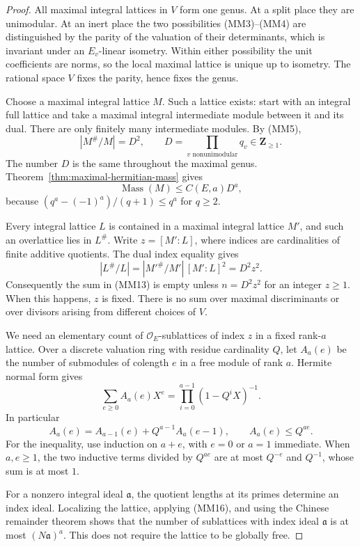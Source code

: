 \begin{proof}
All maximal integral lattices in \(V\) form one genus.  At a split
place they are unimodular.  At an inert place the two possibilities
(MM3)--(MM4) are distinguished by the parity of the valuation of
their determinants, which is invariant under an \(E_v\)-linear
isometry.  Within either possibility the unit coefficients are
norms, so the local maximal lattice is unique up to isometry.
The rational space \(V\) fixes the parity, hence fixes the genus.

Choose a maximal integral lattice \(M\).  Such a lattice exists:
start with an integral full lattice and take a maximal integral
intermediate module between it and its dual.  There are only
finitely many intermediate modules.  By (MM5),
\[
 |M^\#/M|=D^2,\qquad
 D=\prod_{v\text{ nonunimodular}}q_v\in\mathbf Z_{\geq1}.
\]
The number \(D\) is the same throughout the maximal genus.
Theorem~\ref{thm:maximal-hermitian-mass} gives
\[
 \operatorname{Mass}(M)\leq C(E,a)D^a,
 \tag{MM14}
\]
because \((q^a-(-1)^a)/(q+1)\leq q^a\) for \(q\geq2\).

Every integral lattice \(L\) is contained in a maximal integral
lattice \(M'\), and such an overlattice lies in \(L^\#\).
Write \(z=[M':L]\), where indices are cardinalities of finite
additive quotients.  The dual index equality gives
\[
 |L^\#/L|=|M'^\#/M'|\,[M':L]^2=D^2z^2.
 \tag{MM15}
\]
Consequently the sum in (MM13) is empty unless \(n=D^2z^2\)
for an integer \(z\geq1\).  When this happens, \(z\) is fixed.
There is no sum over maximal discriminants or over divisors
arising from different choices of \(V\).

We need an elementary count of \(\mathcal O_E\)-sublattices of
index \(z\) in a fixed rank-\(a\) lattice.  Over a discrete
valuation ring with residue cardinality \(Q\), let \(A_a(e)\)
be the number of submodules of colength \(e\) in a free module
of rank \(a\).  Hermite normal form gives
\[
 \sum_{e\geq0}A_a(e)X^e
                 =\prod_{i=0}^{a-1}(1-Q^iX)^{-1}.
\]
In particular
\[
 A_a(e)=A_{a-1}(e)+Q^{a-1}A_a(e-1),\qquad
                         A_a(e)\leq Q^{ae}.
 \tag{MM16}
\]
For the inequality, use induction on \(a+e\), with \(e=0\)
or \(a=1\) immediate.  When \(a,e\geq1\), the two inductive
terms divided by \(Q^{ae}\) are at most \(Q^{-e}\) and
\(Q^{-1}\), whose sum is at most \(1\).

For a nonzero integral ideal \(\mathfrak a\), the quotient
lengths at its primes determine an index ideal.  Localizing
the lattice, applying (MM16), and using the Chinese remainder
theorem shows that the number of sublattices with index ideal
\(\mathfrak a\) is at most \((N\mathfrak a)^a\).
This does not require the lattice to be globally free.


\end{proof}
